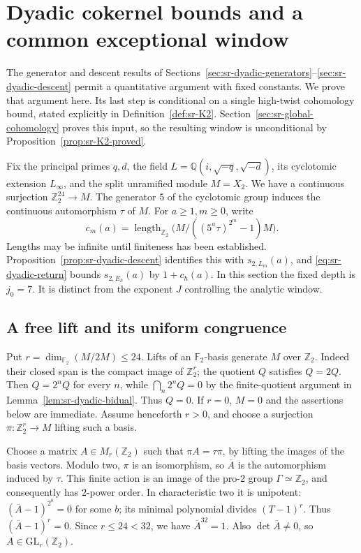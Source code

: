 \section{Dyadic cokernel bounds and a common exceptional window}
\label{sec:sr-dyadic-bounds}
The generator and descent results of
Sections~\ref{sec:sr-dyadic-generators}--\ref{sec:sr-dyadic-descent}
permit a quantitative argument with fixed constants.
We prove that argument here. Its last step is conditional on a
single high-twist cohomology bound, stated explicitly in
Definition~\ref{def:sr-K2}. Section~\ref{sec:sr-global-cohomology}
proves this input, so the resulting window is unconditional by
Proposition~\ref{prop:sr-K2-proved}.

Fix the principal primes \(q,d\), the field
\(L=\mathbb Q(i,\sqrt{-q},\sqrt{-d})\), its cyclotomic extension
\(L_\infty\), and the split unramified module \(M=X_2\).
We have a continuous surjection \(\mathbb Z_2^{24}\to M\).
The generator \(5\) of the cyclotomic group induces the continuous
automorphism \(\tau\) of \(M\).
For \(a\geq1,m\geq0\), write
\[
 c_m(a)=\operatorname{length}_{\mathbb Z_2}
           \bigl(M/((5^a\tau)^{2^m}-1)M\bigr).
\]
Lengths may be infinite until finiteness has been established.
Proposition~\ref{prop:sr-dyadic-descent} identifies this with
\(s_{2,L_m}(a)\), and \eqref{eq:sr-dyadic-return} bounds
\(s_{2,E_h}(a)\) by \(1+c_h(a)\).
In this section the fixed depth is \(j_0=7\).
It is distinct from the exponent \(J\) controlling the analytic window.

\subsection{A free lift and its uniform congruence}
Put \(r=\dim_{\mathbb F_2}(M/2M)\leq24\).
Lifts of an \(\mathbb F_2\)-basis generate \(M\) over
\(\mathbb Z_2\). Indeed their closed span is the compact image of
\(\mathbb Z_2^r\); the quotient \(Q\) satisfies \(Q=2Q\).
Then \(Q=2^nQ\) for every \(n\), while
\(\bigcap_n2^nQ=0\) by the finite-quotient argument in
Lemma~\ref{lem:sr-dyadic-bidual}. Thus \(Q=0\).
If \(r=0\), \(M=0\) and the assertions below are immediate.
Assume henceforth \(r>0\), and choose a surjection
\(\pi:\mathbb Z_2^r\to M\) lifting such a basis.

Choose a matrix \(A\in M_r(\mathbb Z_2)\) such that
\(\pi A=\tau\pi\), by lifting the images of the basis vectors.
Modulo two, \(\pi\) is an isomorphism, so \(\overline A\)
is the automorphism induced by \(\tau\).
This finite action is an image of the pro-\(2\) group
\(\Gamma\simeq\mathbb Z_2\), and consequently has \(2\)-power order.
In characteristic two it is unipotent:
\((\overline A-1)^{2^b}=0\) for some \(b\);
its minimal polynomial divides \((T-1)^r\).
Thus \((\overline A-1)^r=0\).
Since \(r\leq24<32\), we have
\(\overline A^{32}=1\).
Also \(\det\overline A\ne0\), so \(A\in\mathrm{GL}_r(\mathbb Z_2)\).

